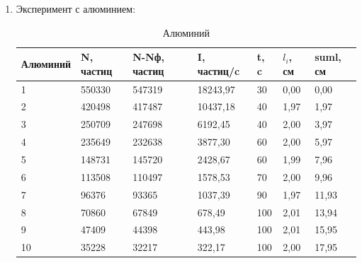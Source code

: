 \documentclass[a4paper]{article}
\begin{document}
\begin{enumerate}
    \item Эксперимент с алюминием:
        \begin{table}[H]
            \begin{center}
                \begin{tabular}{|l|l|l|l|l|l|l|}
                    \hline
                    Алюминий & N, частиц & N-Nф, частиц & I, частиц/c & t, c &  $l_i$, см & suml, см \\ \hline
                    1        & 550330    & 547319       & 18243,97    & 30   & 0,00     & 0,00     \\ \hline
                    2        & 420498    & 417487       & 10437,18    & 40   & 1,97     & 1,97     \\ \hline
                    3        & 250709    & 247698       & 6192,45     & 40   & 2,00     & 3,97     \\ \hline
                    4        & 235649    & 232638       & 3877,30     & 60   & 2,00     & 5,97     \\ \hline
                    5        & 148731    & 145720       & 2428,67     & 60   & 1,99     & 7,96     \\ \hline
                    6        & 113508    & 110497       & 1578,53     & 70   & 2,00     & 9,96     \\ \hline
                    7        & 96376     & 93365        & 1037,39     & 90   & 1,97     & 11,93    \\ \hline
                    8        & 70860     & 67849        & 678,49      & 100  & 2,01     & 13,94    \\ \hline
                    9        & 47409     & 44398        & 443,98      & 100  & 2,01     & 15,95    \\ \hline
                    10       & 35228     & 32217        & 322,17      & 100  & 2,00     & 17,95    \\ \hline
                \end{tabular}
            \caption{Алюминий}
            \end{center}
        \end{table}


\end{enumerate}
\end{document}
